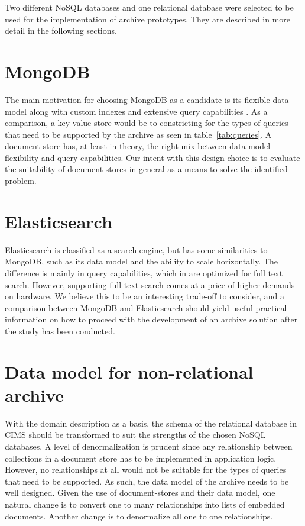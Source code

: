 Two different NoSQL databases and one relational database were selected to be used for the implementation of archive prototypes. They are described in more detail in the following sections.

\section{MongoDB}
The main motivation for choosing MongoDB as a candidate is its flexible data model along with custom indexes and extensive query capabilities \cite{Catell}. As a comparison, a key-value store would be to constricting for the types of queries that need to be supported by the archive as seen in table~\ref{tab:queries}. A document-store has, at least in theory, the right mix between data model flexibility and query capabilities. Our intent with this design choice is to evaluate the suitability of document-stores in general as a means to solve the identified problem. 

\section{Elasticsearch}
Elasticsearch is classified as a search engine, but has some similarities to MongoDB, such as its data model and the ability to scale horizontally. The difference is mainly in query capabilities, which in are optimized for full text search. However, supporting full text search comes at a price of higher demands on hardware. We believe this to be an interesting trade-off to consider, and a comparison between MongoDB and Elasticsearch should yield useful practical information on how to proceed with the development of an archive solution after the study has been conducted.

\section{Data model for non-relational archive}
With the domain description as a basis, the schema of the relational database in CIMS should be transformed to suit the strengths of the chosen NoSQL databases. A level of denormalization is prudent since any relationship between collections in a document store has to be implemented in application logic. However, no relationships at all would not be suitable for the types of queries that need to be supported. As such, the data model of the archive needs to be well designed. Given the use of document-stores and their data model, one natural change is to convert one to many relationships into lists of embedded documents. Another change is to denormalize all one to one relationships.

